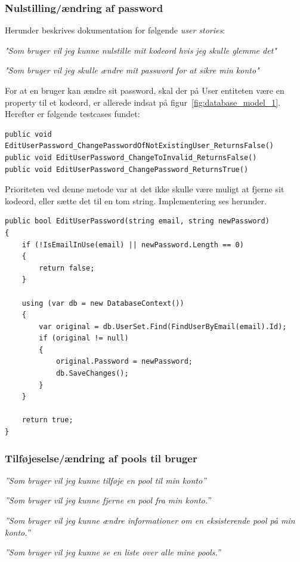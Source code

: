 \subsubsection{Nulstilling/ændring af password}
Herunder beskrives dokumentation for følgende \textit{user stories}:

\textit{"Som bruger vil jeg kunne nulstille mit kodeord hvis jeg skulle glemme det"}

\textit{"Som bruger vil jeg skulle ændre mit password for at sikre min konto"}

For at en bruger kan ændre sit password, skal der på User entiteten være en property til et kodeord, er allerede indsat på figur~\ref{fig:database_model_1}. Herefter er følgende testcases fundet: 

\begin{lstlisting}
public void EditUserPassword_ChangePasswordOfNotExistingUser_ReturnsFalse()
public void EditUserPassword_ChangeToInvalid_ReturnsFalse()
public void EditUserPassword_ChangePassword_ReturnsTrue()
\end{lstlisting}

Prioriteten ved denne metode var at det ikke skulle være muligt at fjerne sit kodeord, eller sætte det til en tom string. Implementering ses herunder.

\begin{lstlisting}
public bool EditUserPassword(string email, string newPassword)
{
	if (!IsEmailInUse(email) || newPassword.Length == 0)
	{
		return false;
	}
	
	using (var db = new DatabaseContext())
	{
		var original = db.UserSet.Find(FindUserByEmail(email).Id);
		if (original != null)
		{
			original.Password = newPassword;
			db.SaveChanges();
		}
	}
	
	return true;
}
\end{lstlisting}

\subsubsection{Tilføjeselse/ændring af pools til bruger}

\textit{''Som bruger vil jeg kunne tilføje en pool til min konto''}

\textit{''Som bruger vil jeg kunne fjerne en pool fra min konto.''}

\textit{''Som bruger vil jeg kunne ændre informationer om en eksisterende pool på min konto.''}

\textit{''Som bruger vil jeg kunne se en liste over alle mine pools.''}

